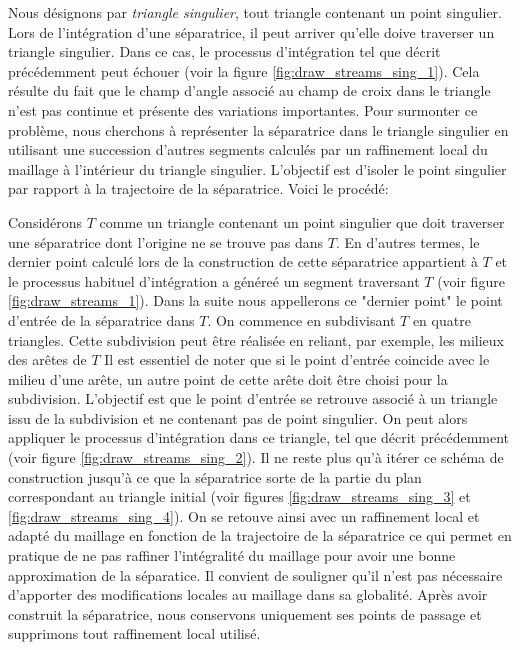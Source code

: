 Nous désignons par \emph{triangle singulier}, tout triangle contenant un point singulier. Lors de l'intégration d'une séparatrice, il peut arriver qu'elle doive traverser un triangle singulier. Dans ce cas, le processus d'intégration tel que décrit précédemment peut échouer (voir la figure \ref{fig:draw_streams_sing_1}). Cela résulte du fait que le champ d'angle associé au champ de croix dans le triangle n'est pas continue et présente des variations importantes. Pour surmonter ce problème, nous cherchons à représenter la séparatrice dans le triangle singulier en utilisant une succession d'autres segments calculés par un raffinement local du maillage à l'intérieur du triangle singulier. L'objectif est d'isoler le point singulier par rapport à la trajectoire de la séparatrice. Voici le procédé:

Considérons $T$ comme un triangle contenant un point singulier que doit traverser une séparatrice dont l'origine ne se trouve pas dans $T$. En d'autres termes, le dernier point calculé lors de la construction de cette séparatrice appartient à $T$ et le processus habituel d'intégration a généreé un segment traversant $T$ (voir figure \ref{fig:draw_streams_1}). Dans la suite nous appellerons ce "dernier point" le point d'entrée de la séparatrice dans $T$. On commence en subdivisant $T$ en quatre triangles. Cette subdivision peut être réalisée en reliant, par exemple, les milieux des arêtes de $T$ Il est essentiel de noter que si le point d'entrée coincide avec le milieu d'une arête, un autre point de cette arête doit être choisi pour la subdivision. L'objectif est que le point d'entrée se retrouve associé à un triangle issu de la subdivision et ne contenant pas de point singulier. On peut alors appliquer le processus d'intégration dans ce triangle, tel que décrit précédemment (voir figure \ref{fig:draw_streams_sing_2}). Il ne reste plus qu'à itérer ce schéma de construction jusqu'à ce que la séparatrice sorte de la partie du plan correspondant au triangle initial (voir figures \ref{fig:draw_streams_sing_3} et \ref{fig:draw_streams_sing_4}). On se retouve ainsi avec un raffinement local et adapté du maillage en fonction de la trajectoire de la séparatrice ce qui permet en pratique de ne pas raffiner l'intégralité du maillage pour avoir une bonne approximation de la séparatice. Il convient de souligner qu'il n'est pas nécessaire d'apporter des modifications locales au maillage dans sa globalité. Après avoir construit la séparatrice, nous conservons uniquement ses points de passage et supprimons tout raffinement local utilisé.


